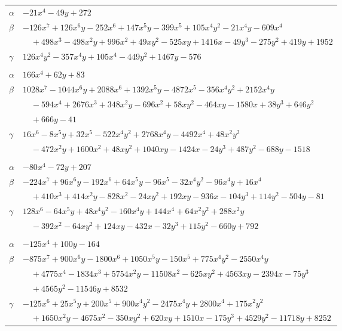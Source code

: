 \documentclass[11pt]{article}
\begin{document}
\begin{longtable}{@{}ll@{}}
$\alpha$ & $-21x^{4}-49y+272$\\
$\beta$ & $-126x^{7}+126x^{6}y-252x^{6}+147x^{5}y-399x^{5}+105x^{4}y^{2}-21x^{4}y-609x^{4}$\\
 & $\quad +498x^{3}-498x^{2}y+996x^{2}+49xy^{2}-525xy+1416x-49y^{3}-275y^{2}+419y+1952$\\
$\gamma$ & $126x^{4}y^{2}-357x^{4}y+105x^{4}-449y^{2}+1467y-576$\\
\addlinespace[3pt]
\multicolumn{2}{@{}l}{$\{i,j\}=\{6,53\}$, $k_{ij}=1$}\\
$\alpha$ & $166x^{4}+62y+83$\\
$\beta$ & $1028x^{7}-1044x^{6}y+2088x^{6}+1392x^{5}y-4872x^{5}-356x^{4}y^{2}+2152x^{4}y$\\
 & $\quad -594x^{4}+2676x^{3}+348x^{2}y-696x^{2}+58xy^{2}-464xy-1580x+38y^{3}+646y^{2}$\\
 & $\quad +666y-41$\\
$\gamma$ & $16x^{6}-8x^{5}y+32x^{5}-522x^{4}y^{2}+2768x^{4}y-4492x^{4}+48x^{2}y^{2}$\\
 & $\quad -472x^{2}y+1600x^{2}+48xy^{2}+1040xy-1424x-24y^{3}+487y^{2}-688y-1518$\\
\addlinespace[3pt]
\multicolumn{2}{@{}l}{$\{i,j\}=\{6,58\}$, $k_{ij}=3^{2}\cdot 5$}\\
$\alpha$ & $-80x^{4}-72y+207$\\
$\beta$ & $-224x^{7}+96x^{6}y-192x^{6}+64x^{5}y-96x^{5}-32x^{4}y^{2}-96x^{4}y+16x^{4}$\\
 & $\quad +410x^{3}+414x^{2}y-828x^{2}-24xy^{2}+192xy-936x-104y^{3}+114y^{2}-504y-81$\\
$\gamma$ & $128x^{6}-64x^{5}y+48x^{4}y^{2}-160x^{4}y+144x^{4}+64x^{2}y^{2}+288x^{2}y$\\
 & $\quad -392x^{2}-64xy^{2}+124xy-432x-32y^{3}+115y^{2}-660y+792$\\
\addlinespace[3pt]
\multicolumn{2}{@{}l}{$\{i,j\}=\{6,69\}$, $k_{ij}=2^{2}\cdot 3^{2}\cdot 11$}\\
$\alpha$ & $-125x^{4}+100y-164$\\
$\beta$ & $-875x^{7}+900x^{6}y-1800x^{6}+1050x^{5}y-150x^{5}+775x^{4}y^{2}-2550x^{4}y$\\
 & $\quad +4775x^{4}-1834x^{3}+5754x^{2}y-11508x^{2}-625xy^{2}+4563xy-2394x-75y^{3}$\\
 & $\quad +4565y^{2}-11546y+8532$\\
$\gamma$ & $-125x^{6}+25x^{5}y+200x^{5}+900x^{4}y^{2}-2475x^{4}y+2800x^{4}+175x^{2}y^{2}$\\
 & $\quad +1650x^{2}y-4675x^{2}-350xy^{2}+620xy+1510x-175y^{3}+4529y^{2}-11718y+8252$\\

\end{longtable}
\end{document}
